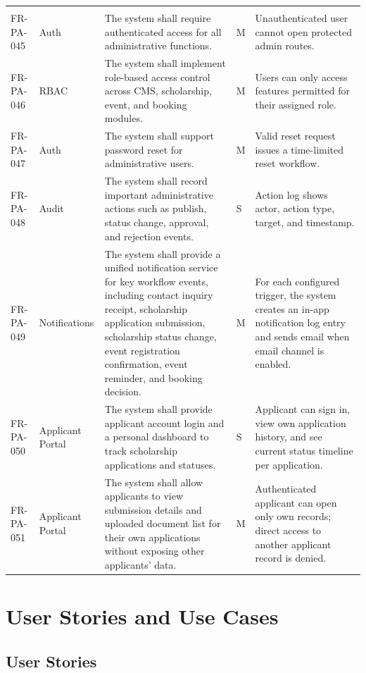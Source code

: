 \documentclass[12pt,a4paper]{article}
\begin{document}
\begin{longtable}{@{}L{2cm}L{2.4cm}L{6cm}C{0.9cm}L{3.4cm}@{}}
\\
FR-PA-045 & Auth & The system shall require authenticated access for all administrative functions. & M & Unauthenticated user cannot open protected admin routes. \\
FR-PA-046 & RBAC & The system shall implement role-based access control across CMS, scholarship, event, and booking modules. & M & Users can only access features permitted for their assigned role. \\
FR-PA-047 & Auth & The system shall support password reset for administrative users. & M & Valid reset request issues a time-limited reset workflow. \\
FR-PA-048 & Audit & The system shall record important administrative actions such as publish, status change, approval, and rejection events. & S & Action log shows actor, action type, target, and timestamp. \\
FR-PA-049 & Notifications & The system shall provide a unified notification service for key workflow events, including contact inquiry receipt, scholarship application submission, scholarship status change, event registration confirmation, event reminder, and booking decision. & M & For each configured trigger, the system creates an in-app notification log entry and sends email when email channel is enabled. \\
FR-PA-050 & Applicant Portal & The system shall provide applicant account login and a personal dashboard to track scholarship applications and statuses. & S & Applicant can sign in, view own application history, and see current status timeline per application. \\
FR-PA-051 & Applicant Portal & The system shall allow applicants to view submission details and uploaded document list for their own applications without exposing other applicants' data. & M & Authenticated applicant can open only own records; direct access to another applicant record is denied. \\
\bottomrule
\end{longtable}

\section{User Stories and Use Cases}

\subsection{User Stories}
\end{document}
